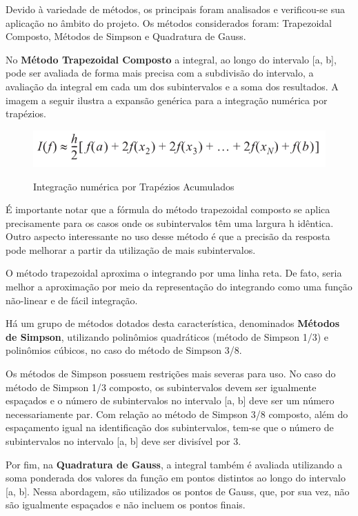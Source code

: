 Devido à variedade de métodos, os principais foram analisados e verificou-se sua aplicação no âmbito do projeto. Os métodos considerados foram: Trapezoidal Composto, Métodos de Simpson e Quadratura de Gauss.

No {\textbf{Método Trapezoidal Composto}} a integral, ao longo do intervalo [a, b], pode ser avaliada de forma mais precisa com a subdivisão do intervalo, a avaliação da integral em cada um dos subintervalos e a soma dos resultados. A imagem a seguir ilustra a expansão genérica para a integração numérica por trapézios.

\begin{figure}[H]
\centering
\includegraphics[keepaspectratio=true,scale=0.52]	{figuras/metodo_trapezoidal.png}
\label{fig:metodo_trapezoidal}
\caption{Integração numérica por Trapézios Acumulados}
\end{figure}

É importante notar que a fórmula do método trapezoidal composto se aplica precisamente para os casos onde os subintervalos têm uma largura h idêntica. Outro aspecto interessante no uso desse método é que a precisão da resposta pode melhorar a partir da utilização de mais subintervalos.

O método trapezoidal aproxima o integrando por uma linha reta. De fato, seria melhor a aproximação por meio da representação do integrando como uma função não-linear e de fácil integração.

Há um grupo de métodos dotados desta característica, denominados \textbf{Métodos de Simpson}, utilizando polinômios quadráticos (método de Simpson 1/3) e polinômios cúbicos, no caso do método de Simpson 3/8.

Os métodos de Simpson possuem restrições mais severas para uso. No caso do método de Simpson 1/3 composto, os subintervalos devem ser igualmente espaçados e o número de subintervalos no intervalo [a, b] deve ser um número necessariamente par. Com relação ao método de Simpson 3/8 composto, além do espaçamento igual na identificação dos subintervalos, tem-se que o número de subintervalos no intervalo [a, b] deve ser divisível por 3.

Por fim, na \textbf{Quadratura de Gauss}, a integral também é avaliada utilizando a soma ponderada dos valores da função em pontos distintos ao longo do intervalo [a, b]. Nessa abordagem, são utilizados os pontos de Gauss, que, por sua vez, não são igualmente espaçados e não incluem os pontos finais.

